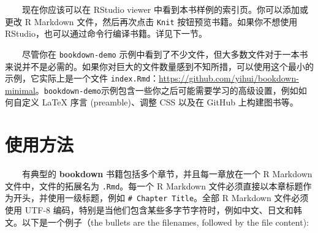 \documentclass[
  12pt,
]{krantz}
\theoremstyle{definition}
\theoremstyle{definition}
\theoremstyle{definition}
\theoremstyle{definition}
\theoremstyle{remark}
\begin{document}
  现在你应该可以在 RStudio viewer 中看到本书样例的索引页。你可以添加或更改 R Markdown 文件，然后再次点击 \texttt{Knit} 按钮预览书籍。如果你不想使用 RStudio，也可以通过命令行编译书籍。详见下一节。

  尽管你在 \texttt{bookdown-demo} 示例中看到了不少文件，但大多数文件对于一本书来说并不是必需的。如果你对巨大的文件数量感到不知所措，可以使用这个最小的示例，它实际上是一个文件 \texttt{index.Rmd}：\url{https://github.com/yihui/bookdown-minimal}。\texttt{bookdown-demo}示例包含一些你之后可能需要学习的高级设置，例如如何自定义 LaTeX 序言 (preamble)、调整 CSS 以及在 GitHub 上构建图书等。

\hypertarget{usage}{%
\section{使用方法}\label{usage}}

  有典型的 \textbf{bookdown} 书籍包括多个章节，并且每一章放在一个 R Markdown 文件中，文件的拓展名为 \texttt{.Rmd}。每一个 R Markdown 文件必须直接以本章标题作为开头，并使用一级标题，例如 \texttt{\#\ Chapter\ Title}。全部 R Markdown 文件必须使用 UTF-8 编码，特别是当他们包含某些多字节字符时，例如中文、日文和韩文。以下是一个例子（the bullets are the filenames, followed by the file content):
\end{document}
